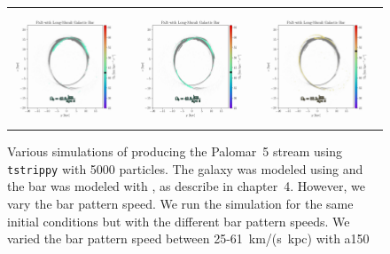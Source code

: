 \begin{figure}
\begin{tabular}{ccc}
                    \includegraphics[width=.32\linewidth]{images/frame_0065.png}&
                    \includegraphics[width=.32\linewidth]{images/frame_0066.png}&
                    \includegraphics[width=.32\linewidth]{images/frame_0104.png}\\
                \end{tabular}
                \caption[The presence of a stellar bar with different rotational speeds damaging the Palomar~5 stream]{Various simulations of producing the Palomar~5 stream using \texttt{tstrippy} with 5000 particles. The galaxy was modeled using \citet{2017A&A...598A..66P} and the bar was modeled with \citet{1997MNRAS.291..717M}, as describe in chapter~4. However, we vary the bar pattern speed. We run the simulation for the same initial conditions but with the different bar pattern speeds. We varied the bar pattern speed between 25-61~km/(s~kpc) with a150  }
                \label{fig:pal5_with_bar}
            \end{figure}

    

